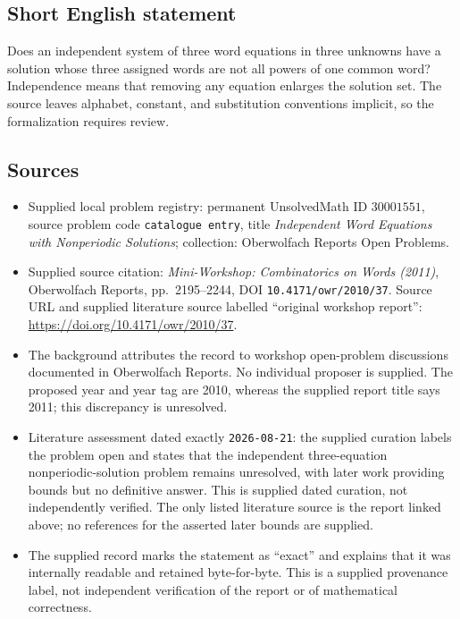 \documentclass[11pt]{article}
\begin{document}
\subsection{Short English statement}
Does an independent system of three word equations in three unknowns have a solution whose three assigned words are not all powers of one common word? Independence means that removing any equation enlarges the solution set. The source leaves alphabet, constant, and substitution conventions implicit, so the formalization requires review.
\subsection{Sources}
\begin{itemize}
\item Supplied local problem registry: permanent UnsolvedMath ID \(30001551\), source problem code \texttt{catalogue entry}, title \emph{Independent Word Equations with Nonperiodic Solutions}; collection: Oberwolfach Reports Open Problems.
\item Supplied source citation: \emph{Mini-Workshop: Combinatorics on Words (2011)}, Oberwolfach Reports, pp.\ 2195--2244, DOI \texttt{10.4171/owr/2010/37}. Source URL and supplied literature source labelled ``original workshop report'': \url{https://doi.org/10.4171/owr/2010/37}.
\item The background attributes the record to workshop open-problem discussions documented in Oberwolfach Reports. No individual proposer is supplied. The proposed year and year tag are 2010, whereas the supplied report title says 2011; this discrepancy is unresolved.
\item Literature assessment dated exactly \texttt{2026-08-21}: the supplied curation labels the problem open and states that the independent three-equation nonperiodic-solution problem remains unresolved, with later work providing bounds but no definitive answer. This is supplied dated curation, not independently verified. The only listed literature source is the report linked above; no references for the asserted later bounds are supplied.
\item The supplied record marks the statement as ``exact'' and explains that it was internally readable and retained byte-for-byte. This is a supplied provenance label, not independent verification of the report or of mathematical correctness.
\end{itemize}
\end{document}
